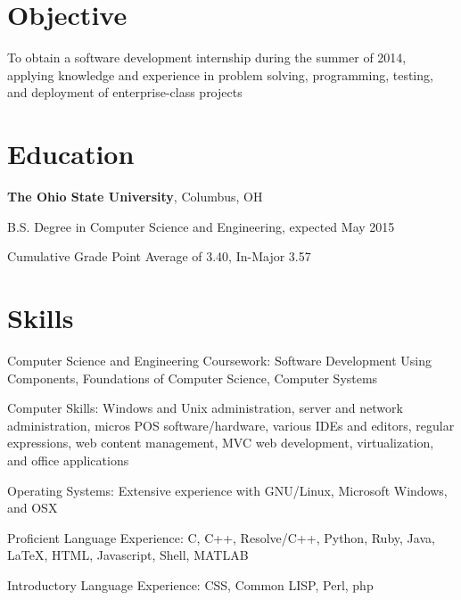 \documentclass[letterpaper]{resume}
\begin{document}
\author{Christopher John Wallace}
\maketitle

\section{Objective}
\begin{compactitem}
\item
	To obtain a software development internship during the summer of 2014, applying
	knowledge and experience in problem solving, programming, testing, and
	deployment of enterprise-class projects
\end{compactitem}

\section{Education}
\textbf{The Ohio State University}, Columbus, OH

\begin{compactitem}
\item B.S. Degree in Computer Science and Engineering, expected May 2015
\item Cumulative Grade Point Average of 3.40, In-Major 3.57
\end{compactitem}

\section{Skills}

\begin{compactitem}
\item Computer Science and Engineering Coursework:
	Software Development Using Components, Foundations of Computer Science,
	Computer Systems

\item Computer Skills: Windows and Unix administration, server and network
	administration, micros POS software/hardware, various IDEs and editors,
	regular expressions, web content management, MVC web development,
	virtualization, and office applications

\item Operating Systems: Extensive experience with GNU/Linux,
	Microsoft Windows, and OSX

\item Proficient Language Experience: C, C++, Resolve/C++, Python, Ruby, Java,
	\LaTeX, HTML, Javascript, Shell, MATLAB
\item Introductory Language Experience: CSS, Common LISP, Perl, php

\end{compactitem}
\end{document}
